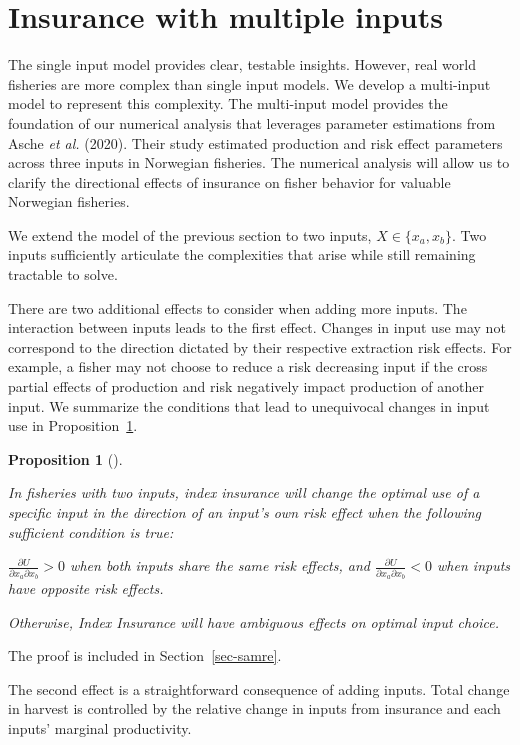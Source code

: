 \documentclass[
  letterpaper,
  DIV=11,
  numbers=noendperiod]{scrartcl}
\theoremstyle{plain}
\theoremstyle{plain}
\newtheorem{proposition}{Proposition}[section]
\theoremstyle{remark}
\begin{document}
\section{Insurance with multiple inputs}\label{sec-multi}

The single input model provides clear, testable insights. However, real
world fisheries are more complex than single input models. We develop a
multi-input model to represent this complexity. The multi-input model
provides the foundation of our numerical analysis that leverages
parameter estimations from Asche \emph{et al.} (2020). Their study
estimated production and risk effect parameters across three inputs in
Norwegian fisheries. The numerical analysis will allow us to clarify the
directional effects of insurance on fisher behavior for valuable
Norwegian fisheries.

We extend the model of the previous section to two inputs,
\(X\in\{{x_a,x_b}\}\). Two inputs sufficiently articulate the
complexities that arise while still remaining tractable to solve.

There are two additional effects to consider when adding more inputs.
The interaction between inputs leads to the first effect. Changes in
input use may not correspond to the direction dictated by their
respective extraction risk effects. For example, a fisher may not choose
to reduce a risk decreasing input if the cross partial effects of
production and risk negatively impact production of another input. We
summarize the conditions that lead to unequivocal changes in input use
in Proposition~\ref{prp-samre}.

\begin{proposition}[]\protect\hypertarget{prp-samre}{}\label{prp-samre}

In fisheries with two inputs, index insurance will change the optimal
use of a specific input in the direction of an input's own risk effect
when the following sufficient condition is true:

\(\frac{\partial U}{\partial x_a\partial x_b}>0\) when both inputs share
the same risk effects, and
\(\frac{\partial U}{\partial x_a\partial x_b}<0\) when inputs have
opposite risk effects.

Otherwise, Index Insurance will have ambiguous effects on optimal input
choice.

\end{proposition}

The proof is included in Section~\ref{sec-samre}.

The second effect is a straightforward consequence of adding inputs.
Total change in harvest is controlled by the relative change in inputs
from insurance and each inputs' marginal productivity.
\end{document}
